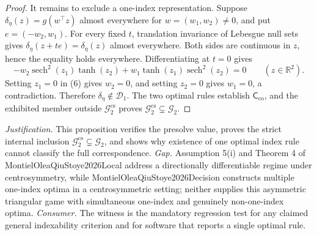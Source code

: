 \documentclass{article}
\begin{document}
\begin{proof}
It remains to exclude a one-index representation. Suppose
\(\delta_{\eta}(z)=g(w^{\top}z)\) almost everywhere for \(w=(w_1,w_2)\neq0\), and put \(e=(-w_2,w_1)\). For every fixed \(t\), translation invariance of Lebesgue null sets gives
\(\delta_{\eta}(z+te)=\delta_{\eta}(z)\) almost everywhere. Both sides are continuous in \(z\), hence the equality holds everywhere. Differentiating at \(t=0\) gives
\[
 -w_2\operatorname{sech}^2(z_1)\tanh(z_2)
 +w_1\tanh(z_1)\operatorname{sech}^2(z_2)=0
 \qquad(z\in\mathbb R^2). \tag{6}
\]
Setting \(z_1=0\) in (6) gives \(w_2=0\), and setting \(z_2=0\) gives \(w_1=0\), a contradiction. Therefore \(\delta_{\eta}\notin\mathcal D_1\). The two optimal rules establish \(\mathsf C_{\mathrm{co}}\), and the exhibited member outside \(\mathcal G_2^{\mathrm{cs}}\) proves \(\mathcal G_2^{\mathrm{cs}}\subsetneq\mathcal G_2\).
\end{proof}
\par\smallskip\noindent \textit{Justification.} This proposition verifies the presolve value, proves the strict internal inclusion \(\mathcal G_2^{\mathrm{cs}}\subsetneq\mathcal G_2\), and shows why existence of one optimal index rule cannot classify the full correspondence. \textit{Gap.} Assumption 5(i) and Theorem 4 of MontielOleaQiuStoye2026Local address a directionally differentiable regime under centrosymmetry, while MontielOleaQiuStoye2026Decision constructs multiple one-index optima in a centrosymmetric setting; neither supplies this asymmetric triangular game with simultaneous one-index and genuinely non-one-index optima. \textit{Consumer.} The witness is the mandatory regression test for any claimed general indexability criterion and for software that reports a single optimal rule.
\end{document}
